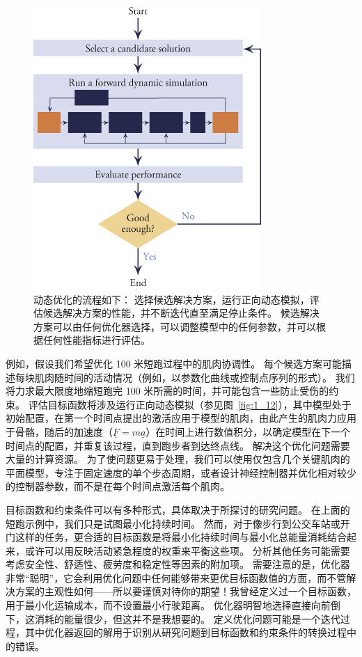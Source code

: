 \begin{figure}[!htb]
	\centering
	\includegraphics[width=0.55\linewidth]{chap9/9_15}
	\caption{动态优化的流程如下：
		选择候选解决方案，运行正向动态模拟，评估候选解决方案的性能，并不断迭代直至满足停止条件。
		候选解决方案可以由任何优化器选择，可以调整模型中的任何参数，并可以根据任何性能指标进行评估。 \label{fig:9_15}}
\end{figure}


例如，假设我们希望优化 100 米短跑过程中的肌肉协调性。
每个候选方案可能描述每块肌肉随时间的活动情况（例如，以参数化曲线或控制点序列的形式）。
我们将力求最大限度地缩短跑完 100 米所需的时间，并可能包含一些防止受伤的约束。
评估目标函数将涉及运行正向动态模拟（参见图~\ref{fig:1_12}），其中模型处于初始配置，在第一个时间点提出的激活应用于模型的肌肉，由此产生的肌肉力应用于骨骼，随后的加速度（$\underline{F} = m \underline{a}$）在时间上进行数值积分，以确定模型在下一个时间点的配置，并重复该过程，直到跑步者到达终点线。
解决这个优化问题需要大量的计算资源。
为了使问题更易于处理，我们可以使用仅包含几个关键肌肉的平面模型，专注于固定速度的单个步态周期，或者设计神经控制器并优化相对较少的控制器参数，而不是在每个时间点激活每个肌肉。


目标函数和约束条件可以有多种形式，具体取决于所探讨的研究问题。
在上面的短跑示例中，我们只是试图最小化持续时间。
然而，对于像步行到公交车站或开门这样的任务，更合适的目标函数是将最小化持续时间与最小化总能量消耗结合起来，或许可以用反映活动紧急程度的权重来平衡这些项。
分析其他任务可能需要考虑安全性、舒适性、疲劳度和稳定性等因素的附加项。
需要注意的是，优化器非常“聪明”，它会利用优化问题中任何能够带来更优目标函数值的方面，而不管解决方案的主观性如何——所以要谨慎对待你的期望！我曾经定义过一个目标函数，用于最小化运输成本，而不设置最小行驶距离。
优化器明智地选择直接向前倒下，这消耗的能量很少，但这并不是我想要的。
定义优化问题可能是一个迭代过程，其中优化器返回的解用于识别从研究问题到目标函数和约束条件的转换过程中的错误。


